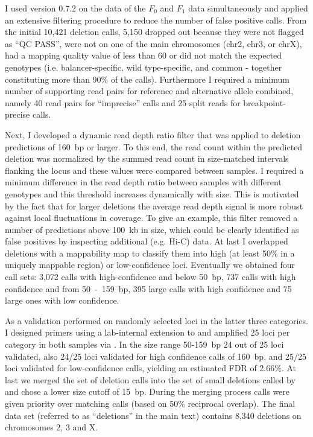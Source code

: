 I used \delly version 0.7.2 on the \wgs data of the $F_0$ and $F_1$ data
simultaneously and applied an extensive filtering procedure to reduce the number
of false positive calls. From the initial 10,421 deletion calls, 5,150 dropped
out because they were not flagged as ``QC PASS'', were not on one of the main
chromosomes (\ac{chr2}, \ac{chr3}, or \ac{chrX}), had a mapping quality value of
less than 60 or did not match the expected genotypes (i.e. balancer-specific,
wild type-specific, and common - together constituting more than 90\% of the calls).
Furthermore I required a minimum number of supporting read pairs for reference
and alternative allele combined, namely 40 read pairs for ``imprecise'' \delly
calls and 25 split reads for breakpoint-precise \delly calls.

Next, I developed a dynamic read depth ratio filter that was applied to deletion
predictions of 160~bp or larger.
To this end, the read count within the predicted deletion was normalized by the
summed read count in size-matched intervals flanking the locus and these values
were compared between samples. I required a minimum difference in the read depth
ratio between samples with different genotypes and this threshold increases
dynamically with \sv size. This is motivated by the fact that for larger deletions
the average read depth signal is more robust against local fluctuations in coverage.
To give an example, this filter removed a number of predictions above 100~kb in
size, which could be clearly identified as false positives by inspecting additional
(e.g. Hi-C) data. At last I overlapped deletions with a mappability map to
classify them into high (at least 50\% in a uniquely mappable region) or
low-confidence loci. Eventually we obtained four call sets: 3,072 calls with
high-confidence and below 50~bp, 737 calls with high confidence and from
50~-~159~bp, 395 large calls with high confidence and 75 large ones with low
confidence.

As a validation \yad performed \pcr on randomly selected loci in the latter three
categories. I designed primers using a lab-internal extension to \primerthree
and \yad amplified 25 loci per category in both samples via \pcr.
In the size range 50-159~bp 24 out of 25 loci validated, also 24/25 loci
validated for high confidence calls of 160~bp, and 25/25 loci validated for
low-confidence calls, yielding an estimated FDR of 2.66\%.
At last we merged the set of \delly deletion calls into the set of small
deletions called by \freebayes and chose a lower size cutoff of 15~bp. During
the merging process \freebayes calls were given priority over matching \delly
calls (based on 50\% reciprocal overlap). The final data set (referred to as
``deletions'' in the main text) contains 8,340 deletions on chromosomes 2, 3 and
X.




